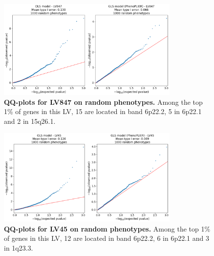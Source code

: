 \documentclass[
  a4paper,
]{article}
\newenvironment{fignos:tagged-figure}[1][]{
  \let\oldfigurename\figurename
  \renewcommand{\figurename}{Supplementary Figure}
}{
  \let\figurename\oldfigurename
}
\begin{document}
\begin{fignos:tagged-figure}[S3]

\begin{figure}
\hypertarget{fig:reg:nulls:qqplot:lv847}{%
\centering
\includegraphics[width=0.8\textwidth,height=\textheight]{images/gls/null_sims/models_lv847.png}
\caption{\textbf{QQ-plots for LV847 on random phenotypes.}
Among the top 1\% of genes in this LV, 15 are located in band 6p22.2, 5 in 6p22.1 and 2 in 15q26.1.}\label{fig:reg:nulls:qqplot:lv847}
}
\end{figure}

\end{fignos:tagged-figure}

\begin{fignos:tagged-figure}[S4]

\begin{figure}
\hypertarget{fig:reg:nulls:qqplot:lv45}{%
\centering
\includegraphics[width=0.8\textwidth,height=\textheight]{images/gls/null_sims/models_lv45.png}
\caption{\textbf{QQ-plots for LV45 on random phenotypes.}
Among the top 1\% of genes in this LV, 12 are located in band 6p22.2, 6 in 6p22.1 and 3 in 1q23.3.}\label{fig:reg:nulls:qqplot:lv45}
}
\end{figure}

\end{fignos:tagged-figure}
\end{document}
